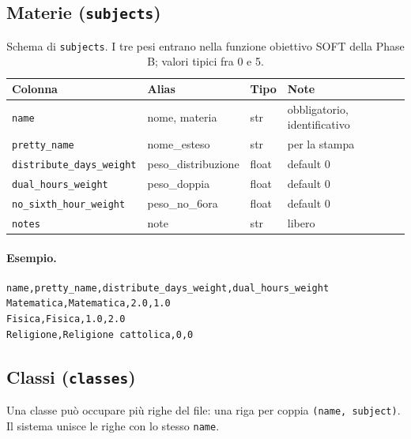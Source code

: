 \subsection{Materie (\texttt{subjects})}

\begin{table}[h]
\centering\small
\begin{tabular}{l l l p{5.0cm}}
\toprule
\textbf{Colonna} & \textbf{Alias} & \textbf{Tipo} & \textbf{Note} \\
\midrule
\texttt{name} & nome, materia & str & obbligatorio, identificativo \\
\texttt{pretty\_name} & nome\_esteso & str & per la stampa \\
\texttt{distribute\_days\_weight} & peso\_distribuzione & float & default 0 \\
\texttt{dual\_hours\_weight} & peso\_doppia & float & default 0 \\
\texttt{no\_sixth\_hour\_weight} & peso\_no\_6ora & float & default 0 \\
\texttt{notes} & note & str & libero \\
\bottomrule
\end{tabular}
\caption{Schema di \texttt{subjects}. I tre pesi entrano nella
funzione obiettivo SOFT della Phase B; valori tipici fra 0 e 5.}
\label{tab:formato_subjects}
\end{table}

\paragraph{Esempio.}
\begin{lstlisting}
name,pretty_name,distribute_days_weight,dual_hours_weight
Matematica,Matematica,2.0,1.0
Fisica,Fisica,1.0,2.0
Religione,Religione cattolica,0,0
\end{lstlisting}

\subsection{Classi (\texttt{classes})}

Una classe pu\`o occupare pi\`u righe del file: una riga per coppia
\texttt{(name, subject)}. Il sistema unisce le righe con lo stesso
\texttt{name}.

